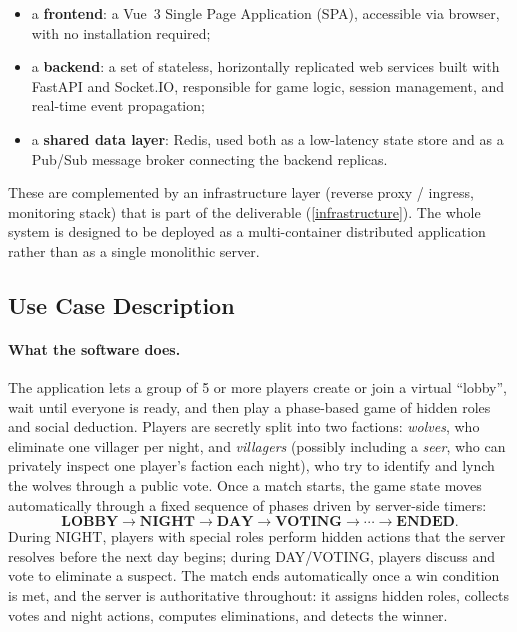\documentclass{scrartcl}
\begin{document}
\begin{itemize}
      \item a \textbf{frontend}: a Vue~3 Single Page Application (SPA), accessible
            via browser, with no installation required;
      \item a \textbf{backend}: a set of stateless, horizontally replicated web
            services built with FastAPI and Socket.IO, responsible for game logic,
            session management, and real-time event propagation;
      \item a \textbf{shared data layer}: Redis, used both as a low-latency state
            store and as a Pub/Sub message broker connecting the backend replicas.
\end{itemize}

These are complemented by an infrastructure layer (reverse proxy / ingress,
monitoring stack) that is part of the deliverable (\cref{infrastructure}). The
whole system is designed to be deployed as a multi-container distributed
application rather than as a single monolithic server.

\subsection{Use Case Description}\label{use-case}

\paragraph{What the software does.}
The application lets a group of 5 or more players create or join a virtual
``lobby'', wait until everyone is ready, and then play a phase-based game of
hidden roles and social deduction. Players are secretly split into two
factions: \emph{wolves}, who eliminate one villager per night, and
\emph{villagers} (possibly including a \emph{seer}, who can privately inspect
one player's faction each night), who try to identify and lynch the wolves
through a public vote. Once a match starts, the game state moves automatically
through a fixed sequence of phases driven by server-side timers:
\[
      \textbf{LOBBY} \rightarrow \textbf{NIGHT} \rightarrow \textbf{DAY}
      \rightarrow \textbf{VOTING} \rightarrow \cdots \rightarrow \textbf{ENDED}.
\]
During NIGHT, players with special roles perform hidden actions that the server
resolves before the next day begins; during DAY/VOTING, players discuss and
vote to eliminate a suspect. The match ends automatically once a win condition
is met, and the server is authoritative throughout: it assigns hidden roles,
collects votes and night actions, computes eliminations, and detects the
winner.
\end{document}
